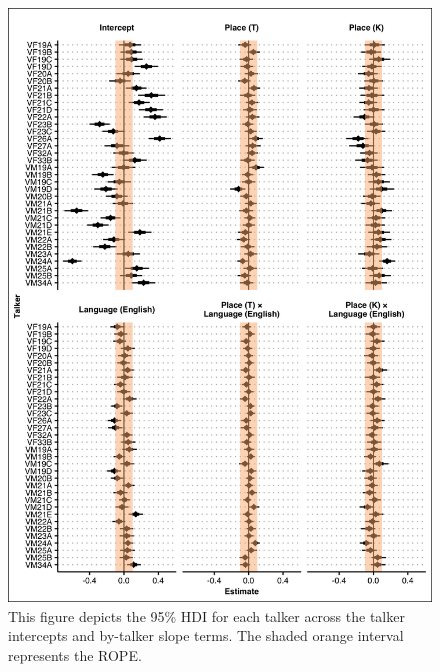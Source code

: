 \begin{figure}[htbp]
  \begin{center}
  \includegraphics[width=0.85\linewidth]{figures/ch4_grpparvar_5in.png} 
  \caption{This figure depicts the 95\% HDI for each talker across the talker intercepts and by-talker slope terms. The shaded orange interval represents the ROPE.}
  \label{ch4:fig:grpparvar}
  \end{center}
\end{figure}

